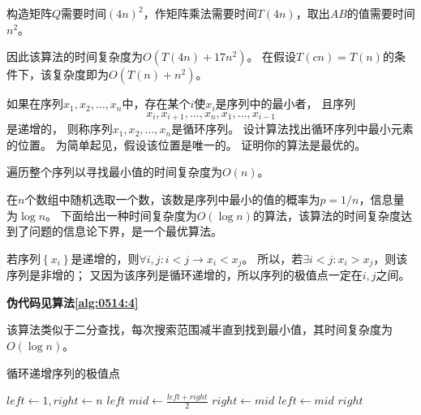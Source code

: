 \begin{questions}
\begin{solution}
        构造矩阵$Q$需要时间$(4n)^2$，作矩阵乘法需要时间$T(4n)$，取出$AB$的值需要时间$n^2$。

        因此该算法的时间复杂度为$O(T(4n) + 17n^2)$。
        在假设$T(cn) = T(n)$的条件下，该复杂度即为$O(T(n)+n^2)$。
    \end{solution}

    \question  如果在序列$x_1,x_2, \dots ,x_n$中，存在某个$i$使$x_i$是序列中的最小者，
    且序列\[ x_i,x_{i+1}, \dots ,x_n,x_1,\dots, x_{i-1} \]是递增的，
    则称序列$x_1,x_2, \dots ,x_n$是循环序列。
    设计算法找出循环序列中最小元素的位置。
    为简单起见，假设该位置是唯一的。
    证明你的算法是最优的。

    \begin{solution}
        遍历整个序列以寻找最小值的时间复杂度为$O(n)$。

        在$n$个数组中随机选取一个数，该数是序列中最小的值的概率为$p = 1 / n$，信息量为$\log n$。
        下面给出一种时间复杂度为$O(\log n)$的算法，该算法的时间复杂度达到了问题的信息论下界，是一个最优算法。

        若序列$\left\{x_i\right\}$是递增的，则$\forall i,j : i < j \rightarrow x_i < x_j$。
        所以，若$\exists i < j : x_i > x_j $，则该序列是非增的；
        又因为该序列是循环递增的，所以序列的极值点一定在$i,j$之间。

        \textbf{伪代码见算法\ref{alg:0514:4}}

        该算法类似于二分查找，每次搜索范围减半直到找到最小值，其时间复杂度为$O(\log n)$。

    \end{solution}

    \begin{algorithm}[!ht]
        \caption{循环递增序列的极值点}\label{alg:0514:4}
        \begin{algorithmic}[1]
            \State $left \gets 1, right \gets n$
                
            \State \Return $left$
            \Else
            \Repeat
            \State $mid \gets \frac{left + right}{2}$
                 
            \State $right \gets mid$
            \Else                           {}
            \State $left \gets mid$
            \EndIf
            \State \Return $right$
            \EndIf
        \end{algorithmic}
    \end{algorithm}

\end{questions}
